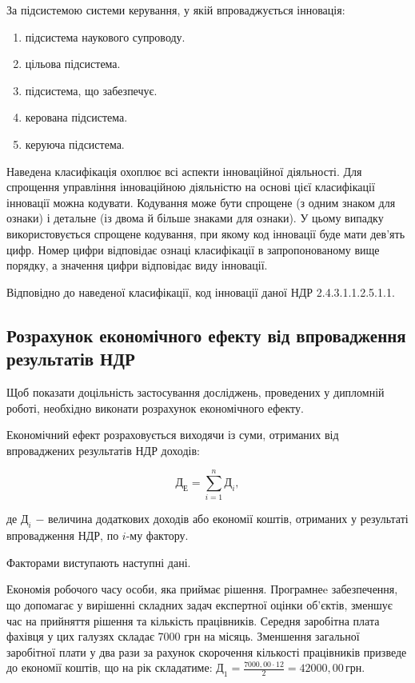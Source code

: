 За підсистемою системи керування, у якій впроваджується інновація:

\begin{enumerate}
	\item підсистема наукового супроводу.
	\item цільова підсистема.
	\item підсистема, що забезпечує.
	\item керована підсистема.
	\item керуюча підсистема.
\end{enumerate}

Наведена класифікація охоплює всі аспекти інноваційної діяльності. Для спрощення управління інноваційною діяльністю на основі цієї класифікації інновації можна кодувати. Кодування може бути спрощене (з одним знаком для ознаки) і детальне (із двома й більше знаками для ознаки). У цьому випадку використовується спрощене кодування, при якому код інновації буде мати дев'ять цифр. Номер цифри відповідає ознаці класифікації в запропонованому вище порядку, а значення цифри відповідає виду інновації.

Відповідно до наведеної класифікації, код інновації даної НДР 2.4.3.1.1.2.5.1.1.

\subsection{Розрахунок економічного ефекту від впровадження результатів НДР}

Щоб показати доцільність застосування досліджень, проведених у дипломній роботі, необхідно виконати розрахунок економічного ефекту.

Економічний ефект розраховується виходячи із суми, отриманих від впроваджених результатів НДР доходів: 

\begin{equation}\label{eq:economy11}
	\text{Д}_{\text{Е}} = \sum_{i=1}^{n}\text{Д}_{i},
\end{equation}

\noindent де $\text{Д}_{i}$ $-$ величина додаткових доходів або економії коштів, отриманих у\newline
\hspace*{15pt}результаті впровадження НДР, по $i$-му фактору. 

\vspace{1.5em}

Факторами виступають наступні дані.

Економія робочого часу особи, яка приймає рішення. Програмнеe забезпечення, що допомагає у вирішенні складних задач експертної оцінки об’єктів, зменшує час на прийняття рішення та кількість працівників. Середня заробітна плата фахівця у цих галузях складає 7000 грн на місяць. Зменшення загальної заробітної плати у два рази за рахунок скорочення кількості працівників призведе до економії коштів, що на рік складатиме: $\text{Д}_{1} = \frac{7000,00 \cdot 12}{2} = 42000,00 \, \text{грн}$.

